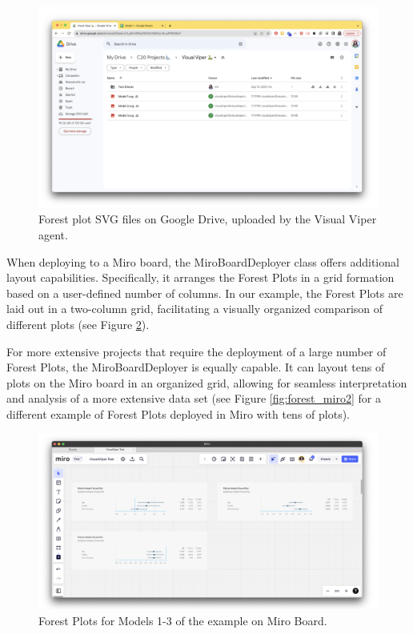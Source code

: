 \begin{figure}[ht]
  \centering
  \includegraphics[width=\textwidth]{media/fig16.png}
  \caption{Forest plot SVG files on Google Drive, uploaded by the Visual Viper agent.}
  \label{fig:forest_svg}
\end{figure}


When deploying to a Miro board, the MiroBoardDeployer class offers
additional layout capabilities. Specifically, it arranges the Forest
Plots in a grid formation based on a user-defined number of columns. In
our example, the Forest Plots are laid out in a two-column grid,
facilitating a visually organized comparison of different plots (see
Figure \ref{fig:forest_miro1}).

For more extensive projects that require the deployment of a large
number of Forest Plots, the MiroBoardDeployer is equally capable. It can
layout tens of plots on the Miro board in an organized grid, allowing
for seamless interpretation and analysis of a more extensive data set
(see Figure \ref{fig:forest_miro2} for a different example of Forest Plots deployed in Miro
with tens of plots).

\begin{figure}[ht]
  \centering
  \includegraphics[width=\textwidth]{media/fig17.png}
  \caption{Forest Plots for Models 1-3 of the example on Miro Board.}
  \label{fig:forest_miro1}
\end{figure}

